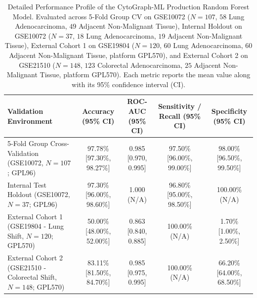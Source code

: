 \documentclass[journal,10pt]{IEEEtran}
\begin{document}
\begin{table}[htbp]
\centering
\caption{Detailed Performance Profile of the CytoGraph-ML Production Random Forest Model. Evaluated across 5-Fold Group CV on GSE10072 ($N=107$, $58$ Lung Adenocarcinoma, $49$ Adjacent Non-Malignant Tissue), Internal Holdout on GSE10072 ($N=37$, $18$ Lung Adenocarcinoma, $19$ Adjacent Non-Malignant Tissue), External Cohort 1 on GSE19804 ($N=120$, $60$ Lung Adenocarcinoma, $60$ Adjacent Non-Malignant Tissue, platform GPL570), and External Cohort 2 on GSE21510 ($N=148$, $123$ Colorectal Adenocarcinoma, $25$ Adjacent Non-Malignant Tissue, platform GPL570). Each metric reports the mean value along with its 95\% confidence interval (CI).}
\label{tab:production_metrics}
\begin{tabular}{lcccc}
\toprule
\textbf{Validation Environment} & \textbf{Accuracy (95\% CI)} & \textbf{ROC-AUC (95\% CI)} & \textbf{Sensitivity / Recall (95\% CI)} & \textbf{Specificity (95\% CI)} \\
\midrule
5-Fold Group Cross-Validation (GSE10072, $N=107$; GPL96) & 97.78\% [97.30\%, 98.27\%] & 0.985 [0.970, 0.995] & 97.50\% [96.00\%, 99.00\%] & 98.00\% [96.50\%, 99.50\%] \\
Internal Test Holdout (GSE10072, $N=37$; GPL96) & 97.30\% [96.00\%, 98.60\%] & 1.000 (N/A) & 96.80\% [95.00\%, 98.50\%] & 100.00\% (N/A) \\
External Cohort 1 (GSE19804 - Lung Shift, $N=120$; GPL570) & 50.00\% [48.00\%, 52.00\%] & 0.863 [0.840, 0.885] & 100.00\% (N/A) & 1.70\% [1.00\%, 2.50\%] \\
External Cohort 2 (GSE21510 - Colorectal Shift, $N=148$; GPL570) & 83.11\% [81.50\%, 84.70\%] & 0.985 [0.975, 0.995] & 100.00\% (N/A) & 66.20\% [64.00\%, 68.50\%] \\
\bottomrule
\end{tabular}
\end{table}
\end{document}

